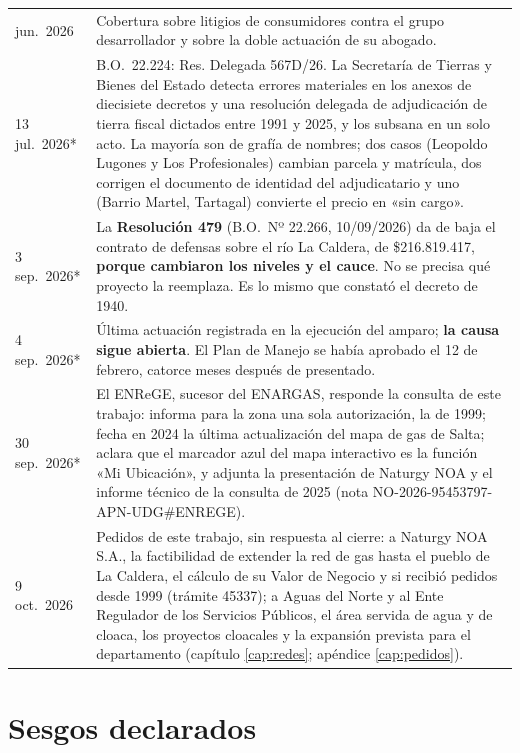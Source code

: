 \begin{longtable}{@{}p{2.7cm}p{10.3cm}@{}}
jun.\ 2026 & Cobertura sobre litigios de consumidores contra el grupo desarrollador y sobre la doble actuación de su abogado. \\
13 jul.\ 2026* & B.O.\ 22.224: Res. Delegada 567D/26. La Secretaría de Tierras y Bienes del Estado detecta errores materiales en los anexos de diecisiete decretos y una resolución delegada de adjudicación de tierra fiscal dictados entre 1991 y 2025, y los subsana en un solo acto. La mayoría son de grafía de nombres; dos casos (Leopoldo Lugones y Los Profesionales) cambian parcela y matrícula, dos corrigen el documento de identidad del adjudicatario y uno (Barrio Martel, Tartagal) convierte el precio en «sin cargo». \\
3 sep.\ 2026* & La \textbf{Resolución 479} (B.O.\ Nº 22.266, 10/09/2026) da de baja el contrato de defensas sobre el río La Caldera, de \$216.819.417, \textbf{porque cambiaron los niveles y el cauce}. No se precisa qué proyecto la reemplaza. Es lo mismo que constató el decreto de 1940. \\
4 sep.\ 2026* & Última actuación registrada en la ejecución del amparo; \textbf{la causa sigue abierta}. El Plan de Manejo se había aprobado el 12 de febrero, catorce meses después de presentado. \\
30 sep.\ 2026* & El ENReGE, sucesor del ENARGAS, responde la consulta de este trabajo: informa para la zona una sola autorización, la de 1999; fecha en 2024 la última actualización del mapa de gas de Salta; aclara que el marcador azul del mapa interactivo es la función «Mi Ubicación», y adjunta la presentación de Naturgy NOA y el informe técnico de la consulta de 2025 (nota NO-2026-95453797-APN-UDG\#ENREGE). \\
9 oct.\ 2026 & Pedidos de este trabajo, sin respuesta al cierre: a Naturgy NOA S.A., la factibilidad de extender la red de gas hasta el pueblo de La Caldera, el cálculo de su Valor de Negocio y si recibió pedidos desde 1999 (trámite 45337); a Aguas del Norte y al Ente Regulador de los Servicios Públicos, el área servida de agua y de cloaca, los proyectos cloacales y la expansión prevista para el departamento (capítulo \ref{cap:redes}; apéndice \ref{cap:pedidos}). \\
\bottomrule
\end{longtable}

\section*{Sesgos declarados}

